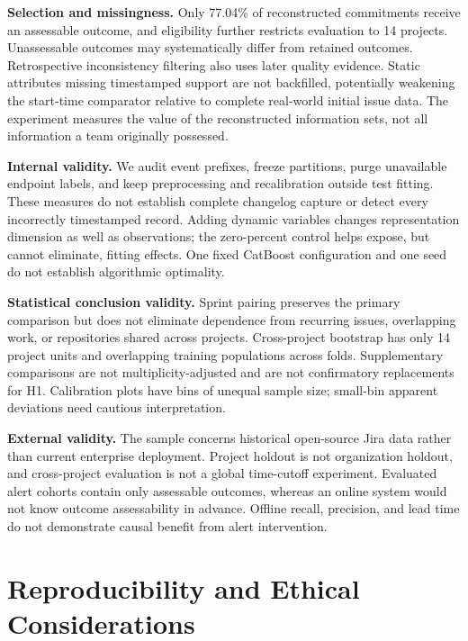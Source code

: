 \documentclass[11pt,a4paper]{article}
\begin{document}
\textbf{Selection and missingness.} Only 77.04\% of reconstructed commitments receive an assessable outcome, and eligibility further restricts evaluation to 14 projects. Unassessable outcomes may systematically differ from retained outcomes. Retrospective inconsistency filtering also uses later quality evidence. Static attributes missing timestamped support are not backfilled, potentially weakening the start-time comparator relative to complete real-world initial issue data. The experiment measures the value of the reconstructed information sets, not all information a team originally possessed.

\textbf{Internal validity.} We audit event prefixes, freeze partitions, purge unavailable endpoint labels, and keep preprocessing and recalibration outside test fitting. These measures do not establish complete changelog capture or detect every incorrectly timestamped record. Adding dynamic variables changes representation dimension as well as observations; the zero-percent control helps expose, but cannot eliminate, fitting effects. One fixed CatBoost configuration and one seed do not establish algorithmic optimality.

\textbf{Statistical conclusion validity.} Sprint pairing preserves the primary comparison but does not eliminate dependence from recurring issues, overlapping work, or repositories shared across projects. Cross-project bootstrap has only 14 project units and overlapping training populations across folds. Supplementary comparisons are not multiplicity-adjusted and are not confirmatory replacements for H1. Calibration plots have bins of unequal sample size; small-bin apparent deviations need cautious interpretation.

\textbf{External validity.} The sample concerns historical open-source Jira data rather than current enterprise deployment. Project holdout is not organization holdout, and cross-project evaluation is not a global time-cutoff experiment. Evaluated alert cohorts contain only assessable outcomes, whereas an online system would not know outcome assessability in advance. Offline recall, precision, and lead time do not demonstrate causal benefit from alert intervention.

\section{Reproducibility and Ethical Considerations}\label{reproducibility-and-ethical-considerations}
\end{document}
